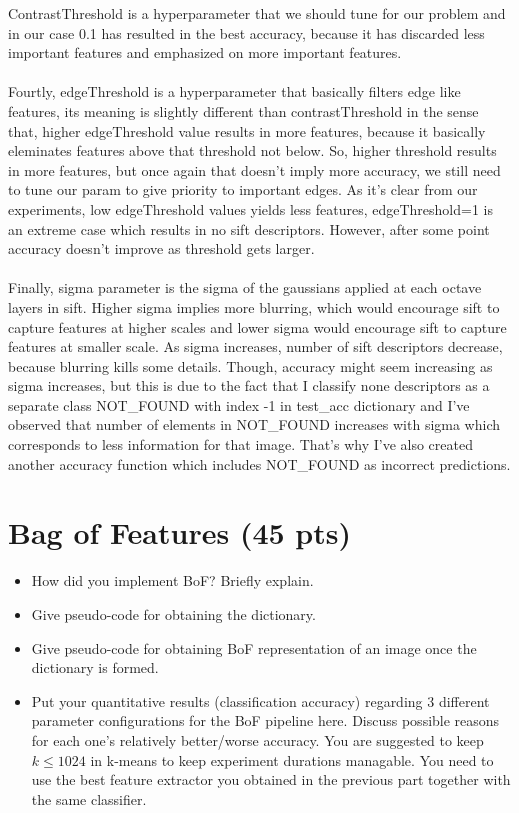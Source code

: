 \documentclass[12pt]{article}
\begin{document}
\begin{center}
        ContrastThreshold is a hyperparameter that we should tune for our problem and in our case 0.1 has resulted in the best accuracy, because it has discarded less important features and emphasized on more important features.
        \\~\\
        Fourtly, edgeThreshold is a hyperparameter that basically filters edge like features, its meaning is slightly different than contrastThreshold in the sense that, higher edgeThreshold value results in more features, because it basically eleminates features above that threshold not below.
        So, higher threshold results in more features, but once again that doesn't imply more accuracy, we still need to tune our param to give priority to important edges.
        As it's clear from our experiments, low edgeThreshold values yields less features, edgeThreshold=1 is an extreme case which results in no sift descriptors. 
        However, after some point accuracy doesn't improve as threshold gets larger.
        \\~\\
        Finally, sigma parameter is the sigma of the gaussians applied at each octave layers in sift.
        Higher sigma implies more blurring, which would encourage sift to capture features at higher scales
        and lower sigma would encourage sift to capture features at smaller scale. 
        As sigma increases, number of sift descriptors decrease, because blurring kills some details.
        Though, accuracy might seem increasing as sigma increases, but this is due to the fact that I classify none descriptors as a separate class NOT\_FOUND with index -1 in test\_acc dictionary 
        and I've observed that number of elements in NOT\_FOUND increases with sigma which corresponds to less information for that image.
        That's why I've also created another accuracy function which includes NOT\_FOUND as incorrect predictions.
        


    \end{center}

\section{Bag of Features (45 pts)}
    \begin{itemize}
        \item How did you implement BoF? Briefly explain.
        \item Give pseudo-code for obtaining the dictionary.
        \item Give pseudo-code for obtaining BoF representation of an image once the dictionary is formed. 
        \item Put your quantitative results (classification accuracy) regarding 3 different parameter configurations for the BoF pipeline here. Discuss possible reasons for each one's relatively better/worse accuracy. You are suggested to keep $k \leq 1024$ in k-means to keep experiment durations managable. You need to use the best feature extractor you obtained in the previous part together with the same classifier.
    \end{itemize}
\end{document}
